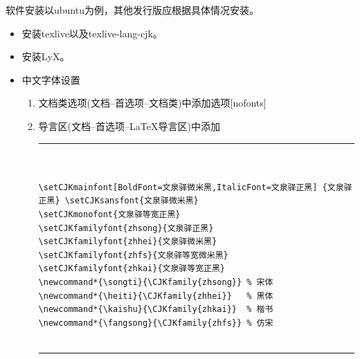 \documentclass[twoside,longtitle]{LZUthesis}
\begin{document}
软件安装以ubuntu为例，其他发行版应根据具体情况安装。
\begin{itemize}
\item 安装texlive以及texlive-lang-cjk。



\item 安装LyX。



\item 中文字体设置

\begin{enumerate}
\item 文档类选项(文档--首选项--文档类)中添加选项{[}nofonts{]}
\item 导言区(文档--首选项--\LaTeX{}导言区)中添加


\tiny
\begin{center}
\hrule


\begin{verbatim}


\setCJKmainfont[BoldFont=文泉驿微米黑,ItalicFont=文泉驿正黑] {文泉驿正黑} \setCJKsansfont{文泉驿微米黑}
\setCJKmonofont{文泉驿等宽正黑}
\setCJKfamilyfont{zhsong}{文泉驿正黑}
\setCJKfamilyfont{zhhei}{文泉驿微米黑}
\setCJKfamilyfont{zhfs}{文泉驿等宽微米黑}
\setCJKfamilyfont{zhkai}{文泉驿等宽正黑}
\newcommand*{\songti}{\CJKfamily{zhsong}} % 宋体
\newcommand*{\heiti}{\CJKfamily{zhhei}}   % 黑体
\newcommand*{\kaishu}{\CJKfamily{zhkai}}  % 楷书
\newcommand*{\fangsong}{\CJKfamily{zhfs}} % 仿宋


\end{verbatim}


\hrule
\end{center}
\normalsize

\end{enumerate}
\end{itemize}
\end{document}
